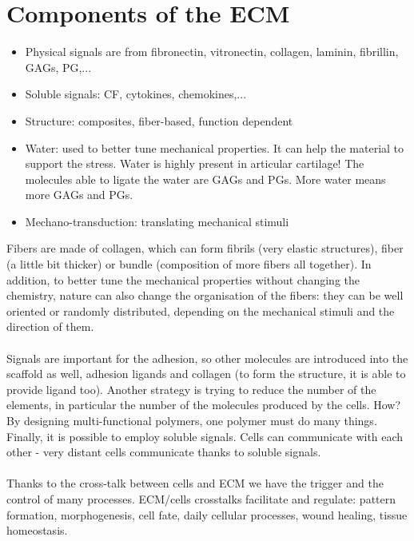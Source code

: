 \section{Components of the ECM}
\begin{itemize}
\item Physical signals are from fibronectin, vitronectin, collagen, laminin, fibrillin, GAGs, PG,...
\item Soluble signals: CF, cytokines, chemokines,...
\item Structure: composites, fiber-based, function dependent
\item Water: used to better tune mechanical properties. It can help the material to support the stress. Water is highly present in articular cartilage! The molecules able to ligate the water are GAGs and PGs. More water means more GAGs and PGs. 
\item Mechano-transduction: translating mechanical stimuli
\end{itemize}
\noindent
Fibers are made of collagen, which can form fibrils (very elastic structures), fiber (a little bit thicker) or bundle (composition of more fibers all together). In addition, to better tune the mechanical properties without changing the chemistry, nature can also change the organisation of the fibers: they can be well oriented or randomly distributed, depending on the mechanical stimuli and the direction of them. 
\\
\\
\noindent
Signals are important for the adhesion, so other molecules are introduced into the scaffold as well, adhesion ligands and collagen (to form the structure, it is able to provide ligand too).
Another strategy is trying to reduce the number of the elements, in particular the number of the molecules produced by the cells. How? By designing multi-functional polymers, one polymer must do many things. Finally, it is possible to employ soluble signals. Cells can communicate with each other - very distant cells communicate thanks to soluble signals.
\\
\\
\noindent
Thanks to the cross-talk between cells and ECM we have the trigger and the control of many processes. ECM/cells crosstalks facilitate and regulate: pattern formation, morphogenesis, cell fate, daily cellular processes, wound healing, tissue homeostasis.

